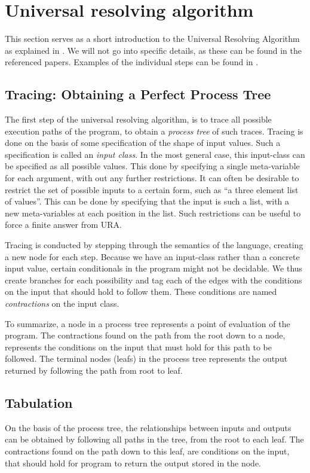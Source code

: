 \documentclass[10pt]{../sigplanconf}
\begin{document}
\section{Universal resolving algorithm}
This section serves as a short introduction to the Universal Resolving
Algorithm as explained in \cite{abramov2000universal,
  abramov2002universal, abramov2002principles}. We will not go into
specific details, as these can be found in the referenced
papers. Examples of the individual steps can be found in
\cite{abramov2000universal}.

\subsection{Tracing: Obtaining a Perfect Process Tree}
The first step of the universal resolving algorithm, is to trace all
possible execution paths of the program, to obtain a \textit{process
  tree} of such traces. Tracing is done on the basis of some
specification of the shape of input values. Such a specification is
called an \textit{input class}. In the most general case, this
input-class can be specified as all possible values. This done by
specifying a single meta-variable for each argument, with out any
further restrictions. It can often be desirable to restrict the set of
possible inputs to a certain form, such as ``a three element list of
values''. This can be done by specifying that the input is such a
list, with a new meta-variables at each position in the list. Such
restrictions can be useful to force a finite answer from URA. 

Tracing is conducted by stepping through the semantics of the
language, creating a new node for each step. Because we have an
input-class rather than a concrete input value, certain conditionals
in the program might not be decidable. We thus create branches for
each possibility and tag each of the edges with the conditions on the
input that should hold to follow them. These conditions are named
\textit{contractions} on the input class.

To summarize, a node in a process tree represents a point of
evaluation of the program. The contractions found on the path from the
root down to a node, represents the conditions on the input that must
hold for this path to be followed. The terminal nodes (leafs) in the
process tree represents the output returned by following the path from
root to leaf.


\subsection{Tabulation}
On the basis of the process tree, the relationships between inputs and
outputs can be obtained by following all paths in the tree, from the
root to each leaf. The contractions found on the path down to this
leaf, are conditions on the input, that should hold for program to
return the output stored in the node.
\end{document}
